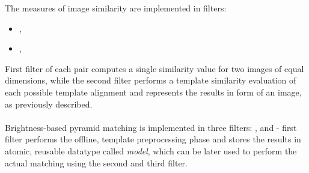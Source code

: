 \begin{refImpl}
The measures of image similarity are implemented in \studio filters:
\begin{itemize}
	\item {}, 
	\item {}, 
\end{itemize}
First filter of each pair computes a single similarity value for two images of equal dimensions, while the second filter performs a template similarity evaluation of each possible template alignment and represents the results in form of an image, as previously described.

\paragraph*{}
Brightness-based pyramid matching is implemented in three \studio filters: ,  and - first filter performs the offline, template preprocessing phase and stores the results in atomic, reusable datatype called \textit{model}, which can be later used to perform the actual matching using the second and third filter.
\end{refImpl}